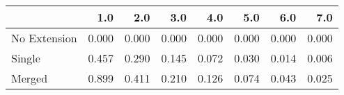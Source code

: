 \begin{tabular}{lrrrrrrr}
\toprule
{} &   1.0 &   2.0 &   3.0 &   4.0 &   5.0 &   6.0 &   7.0 \\
\midrule
No Extension & 0.000 & 0.000 & 0.000 & 0.000 & 0.000 & 0.000 & 0.000 \\
Single       & 0.457 & 0.290 & 0.145 & 0.072 & 0.030 & 0.014 & 0.006 \\
Merged       & 0.899 & 0.411 & 0.210 & 0.126 & 0.074 & 0.043 & 0.025 \\
\bottomrule
\end{tabular}
